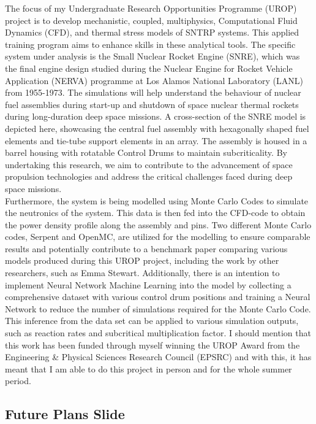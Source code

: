 \documentclass[8pt,a5paper]{article}
\begin{document}
The focus of my Undergraduate Research Opportunities Programme (UROP) project is to develop mechanistic, coupled, multiphysics, Computational Fluid Dynamics (CFD), and thermal stress models of SNTRP systems. This applied training program aims to enhance skills in these analytical tools. The specific system under analysis is the Small Nuclear Rocket Engine (SNRE), which was the final engine design studied during the Nuclear Engine for Rocket Vehicle Application (NERVA) programme at Los Alamos National Laboratory (LANL) from 1955-1973. The simulations will help understand the behaviour of nuclear fuel assemblies during start-up and shutdown of space nuclear thermal rockets during long-duration deep space missions. A cross-section of the SNRE model is depicted here, showcasing the central fuel assembly with hexagonally shaped fuel elements and tie-tube support elements in an array. The assembly is housed in a barrel housing with rotatable Control Drums to maintain subcriticality. By undertaking this research, we aim to contribute to the advancement of space propulsion technologies and address the critical challenges faced during deep space missions.\\

Furthermore, the system is being modelled using Monte Carlo Codes to simulate the neutronics of the system. This data is then fed into the CFD-code to obtain the power density profile along the assembly and pins. Two different Monte Carlo codes, Serpent and OpenMC, are utilized for the modelling to ensure comparable results and potentially contribute to a benchmark paper comparing various models produced during this UROP project, including the work by other researchers, such as Emma Stewart. Additionally, there is an intention to implement Neural Network Machine Learning into the model by collecting a comprehensive dataset with various control drum positions and training a Neural Network to reduce the number of simulations required for the Monte Carlo Code. This inference from the data set can be applied to various simulation outputs, such as reaction rates and subcritical multiplication factor.
I should mention that this work has been funded through myself winning the UROP Award from the Engineering \& Physical Sciences Research Council (EPSRC) and with this, it has meant that I am able to do this project in person and for the whole summer period.

\subsection*{Future Plans Slide}
\end{document}

